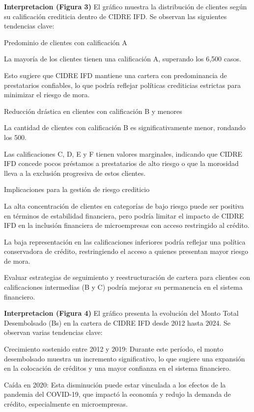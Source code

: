 \documentclass[Royal,times,sageh]{sagej}
\begin{document}
\textbf{Interpretacion (Figura 3)} El gráfico muestra la distribución de
clientes según su calificación crediticia dentro de CIDRE IFD. Se
observan las siguientes tendencias clave:

Predominio de clientes con calificación A

La mayoría de los clientes tienen una calificación A, superando los
6,500 casos.

Esto sugiere que CIDRE IFD mantiene una cartera con predominancia de
prestatarios confiables, lo que podría reflejar políticas crediticias
estrictas para minimizar el riesgo de mora.

Reducción drástica en clientes con calificación B y menores

La cantidad de clientes con calificación B es significativamente menor,
rondando los 500.

Las calificaciones C, D, E y F tienen valores marginales, indicando que
CIDRE IFD concede pocos préstamos a prestatarios de alto riesgo o que la
morosidad lleva a la exclusión progresiva de estos clientes.

Implicaciones para la gestión de riesgo crediticio

La alta concentración de clientes en categorías de bajo riesgo puede ser
positiva en términos de estabilidad financiera, pero podría limitar el
impacto de CIDRE IFD en la inclusión financiera de microempresas con
acceso restringido al crédito.

La baja representación en las calificaciones inferiores podría reflejar
una política conservadora de crédito, restringiendo el acceso a quienes
presentan mayor riesgo de mora.

Evaluar estrategias de seguimiento y reestructuración de cartera para
clientes con calificaciones intermedias (B y C) podría mejorar su
permanencia en el sistema financiero.

\textbf{Interpretacion (Figura 4)} El gráfico presenta la evolución del
Monto Total Desembolsado (Bs) en la cartera de CIDRE IFD desde 2012
hasta 2024. Se observan varias tendencias clave:

Crecimiento sostenido entre 2012 y 2019: Durante este período, el monto
desembolsado muestra un incremento significativo, lo que sugiere una
expansión en la colocación de créditos y una mayor confianza en el
sistema financiero.

Caída en 2020: Esta disminución puede estar vinculada a los efectos de
la pandemia del COVID-19, que impactó la economía y redujo la demanda de
crédito, especialmente en microempresas.
\end{document}

